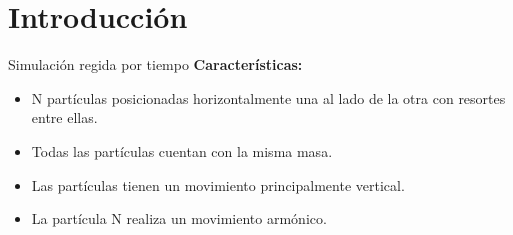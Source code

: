 \section{Introducción}\label{sec:introduccion}
\begin{frame}{Simulación regida por tiempo}
    \textbf{Características:}
    \begin{itemize}
        \item N partículas posicionadas horizontalmente una al lado de la otra con resortes entre ellas.
        \item Todas las partículas cuentan con la misma masa.
        \item Las partículas tienen un movimiento principalmente vertical.
        \item La partícula N realiza un movimiento armónico.
    \end{itemize}
\end{frame}


%
%

